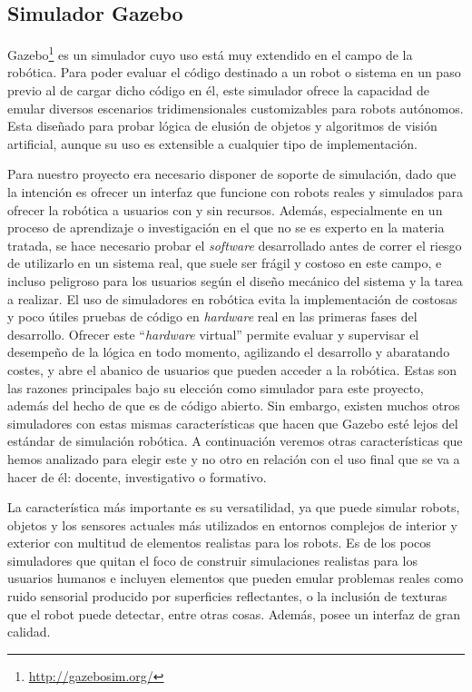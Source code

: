 \subsection{Simulador Gazebo}

Gazebo\footnote{\url{http://gazebosim.org/}} es un simulador cuyo uso está muy extendido en el campo de la robótica. Para poder evaluar el código destinado a un robot o sistema en un paso previo al de cargar dicho código en él, este simulador ofrece la capacidad de emular diversos escenarios tridimensionales customizables para robots autónomos. Esta diseñado para probar lógica de elusión de objetos y algoritmos de visión artificial, aunque su uso es extensible a cualquier tipo de implementación. 

Para nuestro proyecto era necesario disponer de soporte de simulación, dado que la intención es ofrecer un interfaz que funcione con robots reales y simulados para ofrecer la robótica a usuarios con y sin recursos. Además, especialmente en un proceso de aprendizaje o investigación en el que no se es experto en la materia tratada, se hace necesario probar el \textit{software} desarrollado antes de correr el riesgo de utilizarlo en un sistema real, que suele ser frágil y costoso en este campo, e incluso peligroso para los usuarios según el diseño mecánico del sistema y la tarea a realizar. El uso de simuladores en robótica evita la implementación de costosas y poco útiles pruebas de código en \textit{hardware} real en las primeras fases del desarrollo. Ofrecer este ``\textit{hardware} virtual'' permite evaluar y supervisar el desempeño de la lógica en todo momento, agilizando el desarrollo y abaratando costes, y abre el abanico de usuarios que pueden acceder a la robótica. Estas son las razones principales bajo su elección como simulador para este proyecto, además del hecho de que es de código abierto. Sin embargo, existen muchos otros simuladores con estas mismas características que hacen que Gazebo esté lejos del estándar de simulación robótica. A continuación veremos otras características que hemos analizado para elegir este y no otro en relación con el uso final que se va a hacer de él: docente, investigativo o formativo.

La característica más importante es su versatilidad, ya que puede simular robots, objetos y los sensores actuales más utilizados en entornos complejos de
interior y exterior con multitud de elementos realistas para los robots. Es de los pocos simuladores que quitan el foco de construir simulaciones realistas para los usuarios humanos e incluyen elementos que pueden emular problemas reales como ruido sensorial producido por superficies reflectantes, o la inclusión de texturas que el robot puede detectar, entre otras cosas. Además, posee un interfaz de gran calidad.

